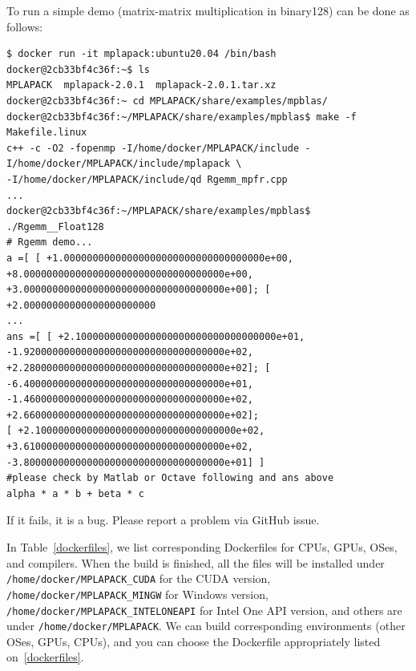 \documentclass[12pt]{article}
\begin{document}
To run a simple demo (matrix-matrix multiplication in binary128) can be done as follows:
{\footnotesize
\begin{verbatim}
$ docker run -it mplapack:ubuntu20.04 /bin/bash
docker@2cb33bf4c36f:~$ ls
MPLAPACK  mplapack-2.0.1  mplapack-2.0.1.tar.xz
docker@2cb33bf4c36f:~ cd MPLAPACK/share/examples/mpblas/
docker@2cb33bf4c36f:~/MPLAPACK/share/examples/mpblas$ make -f Makefile.linux
c++ -c -O2 -fopenmp -I/home/docker/MPLAPACK/include -I/home/docker/MPLAPACK/include/mplapack \
-I/home/docker/MPLAPACK/include/qd Rgemm_mpfr.cpp
...
docker@2cb33bf4c36f:~/MPLAPACK/share/examples/mpblas$ ./Rgemm__Float128
# Rgemm demo...
a =[ [ +1.00000000000000000000000000000000000e+00, +8.00000000000000000000000000000000000e+00,
+3.00000000000000000000000000000000000e+00]; [ +2.00000000000000000000000
...
ans =[ [ +2.10000000000000000000000000000000000e+01, -1.92000000000000000000000000000000000e+02,
+2.28000000000000000000000000000000000e+02]; [ -6.40000000000000000000000000000000000e+01,
-1.46000000000000000000000000000000000e+02, +2.66000000000000000000000000000000000e+02];
[ +2.10000000000000000000000000000000000e+02, +3.61000000000000000000000000000000000e+02,
-3.80000000000000000000000000000000000e+01] ]
#please check by Matlab or Octave following and ans above
alpha * a * b + beta * c
\end{verbatim}
}
If it fails, it is a bug. Please report a problem via GitHub issue.

In Table~\ref{dockerfiles}, we list corresponding Dockerfiles for CPUs, GPUs, OSes, and compilers.
When the build is finished, all the files will be installed under {\tt /home/docker/MPLAPACK\_CUDA} for the CUDA version,
{\tt /home/docker/MPLAPACK\_MINGW} for Windows version, {\tt /home/docker/MPLAPACK\_INTELONEAPI} for Intel One API version,
and others are under {\tt /home/docker/MPLAPACK}.
We can build corresponding environments (other OSes, GPUs, CPUs), and you can choose the Dockerfile appropriately
listed on~\ref{dockerfiles}.
\end{document}
